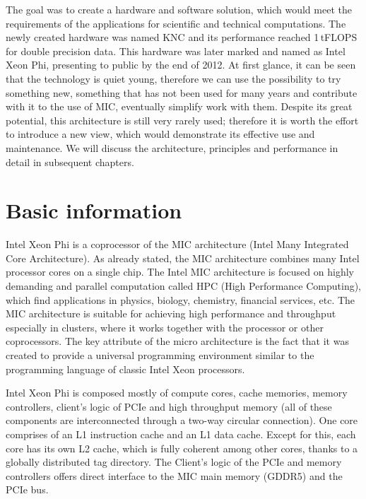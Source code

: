 \par The goal was to create a hardware and software solution, which would meet the requirements of the applications for scientific and technical computations. The newly created hardware was named KNC and its performance reached 1\,tFLOPS for double precision data. This hardware was later marked and named as Intel Xeon Phi, presenting to public by the end of 2012. At first glance, it can be seen that the technology is quiet young, therefore we can use the possibility to try something new, something that has not been used for many years and contribute with it to the use of MIC, eventually simplify work with them. Despite its great potential, this architecture is still very rarely used; therefore it is worth the effort to introduce a new view, which would demonstrate its effective use and maintenance. We will discuss the architecture, principles and performance in detail in subsequent chapters.

\section{Basic information}
\label{sec:basic_info}
Intel Xeon Phi is a coprocessor of the MIC architecture (Intel Many Integrated Core Architecture). As already stated, the MIC architecture combines many Intel processor cores on a single chip. The Intel MIC architecture is focused on highly demanding and parallel computation called HPC (High Performance Computing), which find applications in physics, biology, chemistry, financial services, etc. The MIC architecture is suitable for achieving high performance and throughput especially in clusters, where it works together with the processor or other coprocessors. The key attribute of the micro architecture is the fact that it was created to provide a universal programming environment similar to the programming language of classic Intel Xeon processors.  

\par Intel Xeon Phi is composed mostly of compute cores, cache memories, memory controllers, client's logic of PCIe and high throughput memory (all of these components are interconnected through a two-way circular connection). One core comprises of an L1 instruction cache and an L1 data cache. Except for this, each core has its own L2 cache, which is fully coherent among other cores, thanks to a globally distributed tag directory. The Client's logic of the PCIe and memory controllers offers direct interface to the MIC main memory (GDDR5) and the PCIe bus. 

